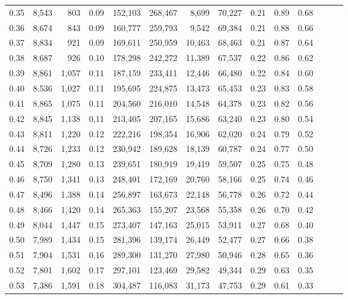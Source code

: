 \begin{tabular}{rrrrrrrrrrrrrr}
0.35 &  8,543 &    803 &  0.09 &  152,103 &  268,467 &   8,699 &  70,227 &  0.21 &  0.89 &      0.68 \\
0.36 &  8,674 &    843 &  0.09 &  160,777 &  259,793 &   9,542 &  69,384 &  0.21 &  0.88 &      0.66 \\
0.37 &  8,834 &    921 &  0.09 &  169,611 &  250,959 &  10,463 &  68,463 &  0.21 &  0.87 &      0.64 \\
0.38 &  8,687 &    926 &  0.10 &  178,298 &  242,272 &  11,389 &  67,537 &  0.22 &  0.86 &      0.62 \\
0.39 &  8,861 &  1,057 &  0.11 &  187,159 &  233,411 &  12,446 &  66,480 &  0.22 &  0.84 &      0.60 \\
0.40 &  8,536 &  1,027 &  0.11 &  195,695 &  224,875 &  13,473 &  65,453 &  0.23 &  0.83 &      0.58 \\
0.41 &  8,865 &  1,075 &  0.11 &  204,560 &  216,010 &  14,548 &  64,378 &  0.23 &  0.82 &      0.56 \\
0.42 &  8,845 &  1,138 &  0.11 &  213,405 &  207,165 &  15,686 &  63,240 &  0.23 &  0.80 &      0.54 \\
0.43 &  8,811 &  1,220 &  0.12 &  222,216 &  198,354 &  16,906 &  62,020 &  0.24 &  0.79 &      0.52 \\
0.44 &  8,726 &  1,233 &  0.12 &  230,942 &  189,628 &  18,139 &  60,787 &  0.24 &  0.77 &      0.50 \\
0.45 &  8,709 &  1,280 &  0.13 &  239,651 &  180,919 &  19,419 &  59,507 &  0.25 &  0.75 &      0.48 \\
0.46 &  8,750 &  1,341 &  0.13 &  248,401 &  172,169 &  20,760 &  58,166 &  0.25 &  0.74 &      0.46 \\
0.47 &  8,496 &  1,388 &  0.14 &  256,897 &  163,673 &  22,148 &  56,778 &  0.26 &  0.72 &      0.44 \\
0.48 &  8,466 &  1,420 &  0.14 &  265,363 &  155,207 &  23,568 &  55,358 &  0.26 &  0.70 &      0.42 \\
0.49 &  8,044 &  1,447 &  0.15 &  273,407 &  147,163 &  25,015 &  53,911 &  0.27 &  0.68 &      0.40 \\
0.50 &  7,989 &  1,434 &  0.15 &  281,396 &  139,174 &  26,449 &  52,477 &  0.27 &  0.66 &      0.38 \\
0.51 &  7,904 &  1,531 &  0.16 &  289,300 &  131,270 &  27,980 &  50,946 &  0.28 &  0.65 &      0.36 \\
0.52 &  7,801 &  1,602 &  0.17 &  297,101 &  123,469 &  29,582 &  49,344 &  0.29 &  0.63 &      0.35 \\
0.53 &  7,386 &  1,591 &  0.18 &  304,487 &  116,083 &  31,173 &  47,753 &  0.29 &  0.61 &      0.33 \\

\end{tabular}
